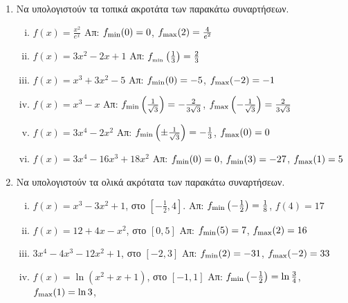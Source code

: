 


\everymath{\displaystyle}



\begin{center}
\end{center}


\vspace{\baselineskip}

\begin{enumerate}
    \item Να υπολογιστούν τα τοπικά ακροτάτα των παρακάτω συναρτήσεων.

        \begin{enumerate}[i)]
        \renewcommand{\itemsep}{15pt}
            \item $ f(x) = \frac{x^{2}}{e^{x}} $
                 \hfill Απ: $ f_{\rm min}(0) = 0 $, $f_{\rm max}(2) = \frac{4}{e^{2}} $ 
            \item $ f(x) = 3x^{2}-2x+1 $ 
                \hfill Απ: $ f_{\rm_{min}}\left(\frac{1}{3} \right) = \frac{2}{3} $ 
            \item $ f(x) = x^{3}+3x^{2}-5 $ 
                \hfill Απ: $ f_{\rm min}(0) = -5 $, $ f_{\rm max}(-2) = -1 $ 
            \item $ f(x) = x^{3} - x $ 
                \hfill Απ: $ f_{\rm min}\left(\frac{1}{\sqrt{3}} \right) 
                = - \frac{2}{3 \sqrt{3}} $, $ f_{\rm max} \left(-\frac{1}{\sqrt{3}} 
                \right) = \frac{2}{3 \sqrt{3}} $
            \item $ f(x) = 3x^{4} - 2x^{2} $ 
                \hfill Απ: $ f_{\rm min}\left(\pm \frac{1}{\sqrt{3}}\right) 
                = - \frac{1}{3} $, $ f_{\rm max}(0) = 0 $
            \item $ f(x) = 3x^{4} -16x^{3}+18x^{2} $ 
                \hfill Απ: $ f_{\rm min}(0)=0 $, $ f_{\rm min}(3)
                =-27 $, $ f_{\rm max}(1) = 5 $ 
        \end{enumerate}

    \item Να υπολογιστούν τα ολικά ακρότατα των παρακάτω συναρτήσεων.
        \begin{enumerate}[i)]
        \renewcommand{\itemsep}{15pt}
            \item $ f(x) = x^{3} - 3x^{2} + 1 $, στο $ \left[- \frac{1}{2}, 4\right] $. 
                \hfill Απ: $ f_{\rm min}\left(- \frac{1}{2}\right) 
                = \frac{1}{8} $, $ f(4) = 17 $
            \item $ f(x) = 12 + 4x - x^{2} $, στο $ [0,5] $ 
                \hfill Απ: $ f_{\rm min}(5)=7 $, $ f_{\rm max}(2)=16 $ 
            \item $ 3x^{4}-4x^{3}-12x^{2} + 1 $, στο $ [-2,3] $ 
                \hfill Απ: $ f_{\rm min}(2)=-31 $, $ f_{\rm max}(-2)=33 $
            \item $ f(x)= \ln{(x^{2}+x+1)} $, στο $ [-1,1] $ 
                \hfill Απ: $ f_{\rm min}\left(-\frac{1}{2}\right)
                = \ln{ \frac{3}{4} }$, $ f_{\rm max}(1)= \ln{3} $,  


\end{enumerate}
\end{enumerate}

